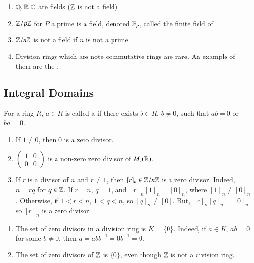 \documentclass[12pt, a4paper, oneside, openright, titlepage]{book}
\begin{document}
\begin{eg}
    \leavevmode
    \begin{enumerate}
        \item $\mathbb Q, \mathbb R, \mathbb C$ are fields ($\mathbb Z$ is \underline{not} a field)
        \item $\mathbb Z/p\mathbb Z$ for $P$ a prime is a field, denoted $\mathbb F_p$, called the finite field of 
        \item $\mathbb Z/n\mathbb Z$ is not a field if $n$ is not a prime
        \item Division rings which are note commutative rings are rare. An example of them are the .
    \end{enumerate}
\end{eg}

\subsection{\textsection Integral Domains}

\begin{defn}
    For a ring $R$, $a \in R$ is called a  if there exists $b \in R$, $b \neq 0$, such that $ab = 0$ or $ba = 0$.
\end{defn}

\begin{rmk}
    \leavevmode
    \begin{enumerate}
        \item If $1 \neq 0$, then $0$ is a zero divisor.
        \item $\begin{pmatrix} 1 & 0 \\ 0 & 0\end{pmatrix}$ is a non-zero zero divisor of $M_2(\mathbb R)$.
        \item If $r$ is a divisor of $n$ and $r \neq 1$, then $[r]_n \in \mathbb Z/n\mathbb Z$ is a zero divisor. Indeed, $n = rq$ for $q \in \mathbb Z$. If $r = n$, $q = 1$, and $[r]_n[1]_n = [0]_n$, where $[1]_n \neq [0]_n$. Otherwise, if $1 < r < n$, $1 < q < n$, so $[q]_n \neq [0]$. But, $[r]_n[q]_n = [0]_n$ so $[r]_n$ is a zero divisor.
    \end{enumerate}
\end{rmk}

\begin{eg}
    \leavevmode
    \begin{enumerate}
        \item The set of zero divisors in a division ring is $K = \{0\}$. Indeed, if $a \in K$, $ab = 0$ for some $b \neq 0$, then $a = abb^{-1} = 0b^{-1} = 0$.
        \item The set of zero divisors of $\mathbb Z$ is $\{0\}$, even though $\mathbb Z$ is not a division ring.
    \end{enumerate}
\end{eg}
\end{document}
